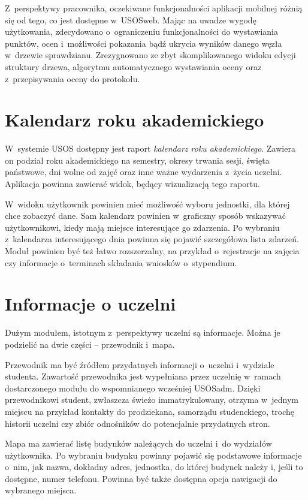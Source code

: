 \documentclass{pracamgr}
\begin{document}
Z~perspektywy pracownika, oczekiwane funkcjonalności aplikacji mobilnej różnią się od tego,
co jest dostępne w~USOSweb. Mając na uwadze wygodę użytkowania, zdecydowano
o~ograniczeniu funkcjonalności do wystawiania punktów, ocen i~możliwości pokazania bądź
ukrycia wyników danego węzła w~drzewie sprawdzianu. Zrezygnowano ze zbyt skomplikowanego
widoku edycji struktury drzewa, algorytmu automatycznego wystawiania oceny oraz z~przepisywania
oceny do protokołu.

\section{Kalendarz roku akademickiego}

W~systemie USOS dostępny jest raport \textit{kalendarz roku akademickiego}. Zawiera on podział
roku akademickiego na semestry, okresy trwania sesji, święta państwowe, dni wolne od zajęć
oraz inne ważne wydarzenia z~życia uczelni. Aplikacja powinna zawierać widok, będący
wizualizacją tego raportu.

W~widoku użytkownik powinien mieć możliwość wyboru jednostki, dla której chce zobaczyć
dane. Sam kalendarz powinien w~graficzny sposób wskazywać użytkownikowi, kiedy mają miejsce 
interesujące go zdarzenia. 
Po wybraniu z~kalendarza interesującego dnia powinna się pojawić szczegółowa lista zdarzeń.
Moduł powinien być też łatwo rozszerzalny, na przykład o~rejestracje na zajęcia czy informacje
o~terminach składania wniosków o~stypendium.

\section{Informacje o uczelni}

Dużym modułem, istotnym z~perspektywy uczelni są informacje. Można je
podzielić na dwie części -- przewodnik i~mapa.

Przewodnik ma być źródłem przydatnych informacji o~uczelni i~wydziale studenta. 
Zawartość przewodnika jest
wypełniana przez uczelnię w~ramach dostarczonego modułu do wspomnianego wcześniej
USOSadm. Dzięki przewodnikowi student, zwłaszcza świeżo immatrykulowany, otrzyma w~jednym
miejscu na przykład kontakty do prodziekana, samorządu studenckiego, trochę historii
uczelni czy zbiór odnośników do potencjalnie przydatnych stron.

Mapa ma zawierać listę budynków należących do uczelni i~do wydziałów użytkownika.
Po wybraniu budynku powinny pojawić się podstawowe informacje o~nim, jak nazwa,
dokładny adres, jednostka, do której budynek należy i, jeśli to dostępne, numer telefonu.
Powinna być także dostępna opcja nawigacji do wybranego miejsca.
\end{document}
